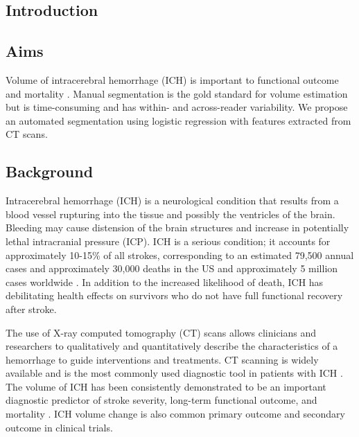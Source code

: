 \documentclass[12pt]{report}
\begin{document}
\newpage
\restoregeometry
\begin{refsection}
\chapter{Introduction}\label{chap1}
\pagestyle{myheadings}
\thispagestyle{myheadings}

\section{Aims}

Volume of intracerebral hemorrhage (ICH) is important to functional outcome and mortality \citep{broderick_volume_1993, tuhrim_volume_1999, hemphill_ich_2001}.  Manual segmentation is the gold standard for volume estimation but is time-consuming and has within- and across-reader variability.  We propose an automated segmentation using logistic regression with features extracted from CT scans.




\section{Background}

Intracerebral hemorrhage (ICH) is a neurological condition that results from a blood vessel rupturing into the tissue and possibly the ventricles of the brain.  Bleeding may cause distension of the brain structures and increase in potentially lethal intracranial pressure (ICP).  ICH is a serious condition; it accounts for approximately 10-15\% of all strokes, corresponding to an estimated 79,500 annual cases \citep{go_heart_2013} and approximately 30,000 deaths \citep{qureshi_spontaneous_2001} in the US and approximately 5 million cases worldwide \citep{krishnamurthi_global_2014}. In addition to the increased likelihood of death, ICH has debilitating health effects on survivors who do not have full functional recovery after stroke.

The use of X-ray computed tomography (CT) scans allows clinicians and researchers to qualitatively and quantitatively describe the characteristics of a hemorrhage to guide interventions and treatments.  CT scanning is widely available and is the most commonly used diagnostic tool in patients with ICH \citep{sahni_management_2007}.  The volume of ICH has been consistently demonstrated to be an important diagnostic predictor of stroke severity, long-term functional outcome, and mortality \citep{broderick_volume_1993, hemphill_ich_2001, tuhrim_volume_1999}.  ICH volume change is also common primary outcome \citep{anderson_intensive_2008, anderson_effects_2010, qureshi_association_2011, mayer_recombinant_2005} and secondary outcome \citep{morgan_preliminary_2008_mistie, anderson_intensive_2008, morgan_preliminary_2008_clear} in clinical trials.  


\end{refsection}
\end{document}
